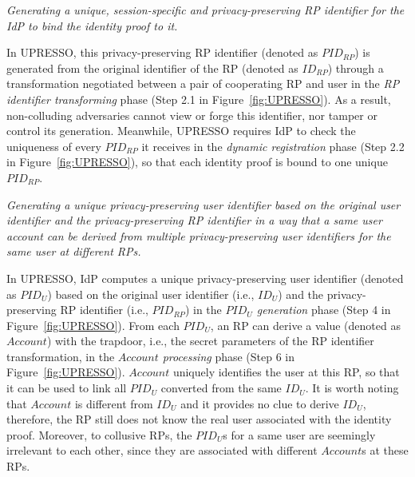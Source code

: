 \vspace{1mm} {\em Generating a unique, session-specific and privacy-preserving RP identifier for the IdP to bind the identity proof to it.}

In UPRESSO, this privacy-preserving RP identifier (denoted as $PID_{RP}$) is generated from the original identifier of the RP (denoted as $ID_{RP}$) through a transformation negotiated between a pair of cooperating RP and user in the \emph{RP identifier transforming} phase (Step 2.1 in Figure~\ref{fig:UPRESSO}). As a result, non-colluding adversaries cannot view or forge this identifier, nor tamper or control its generation. Meanwhile, UPRESSO requires IdP to check the uniqueness of every $PID_{RP}$ it receives in the \emph{dynamic registration} phase (Step 2.2 in Figure~\ref{fig:UPRESSO}), so that each identity proof is bound to one unique $PID_{RP}$.



\vspace{1mm} {\em Generating a unique privacy-preserving user identifier based on the original user identifier and the privacy-preserving RP identifier in a way that a same user account can be derived from multiple privacy-preserving user identifiers for the same user at different RPs.}


In UPRESSO, IdP computes a unique privacy-preserving user identifier (denoted as $PID_U$) based on the original user identifier (i.e., $ID_U$) and the privacy-preserving RP identifier (i.e., $PID_{RP}$) in the \emph{$PID_U$ generation} phase (Step 4 in Figure~\ref{fig:UPRESSO}). From each $PID_U$, an RP can derive a value (denoted as $Account$) with the trapdoor, i.e., the secret parameters of the RP identifier transformation, in the \emph{$Account$ processing} phase (Step 6 in Figure~\ref{fig:UPRESSO}). $Account$ uniquely identifies the user at this RP, so that it can be used to link all $PID_U$ converted from the same $ID_U$. It is worth noting that $Account$ is different from $ID_U$ and it provides no clue to derive $ID_U$, therefore, the RP still does not know the real user associated with the identity proof. Moreover, to collusive RPs, the $PID_U$s for a same user are seemingly irrelevant to each other, since they are associated with different $Account$s at these RPs.



